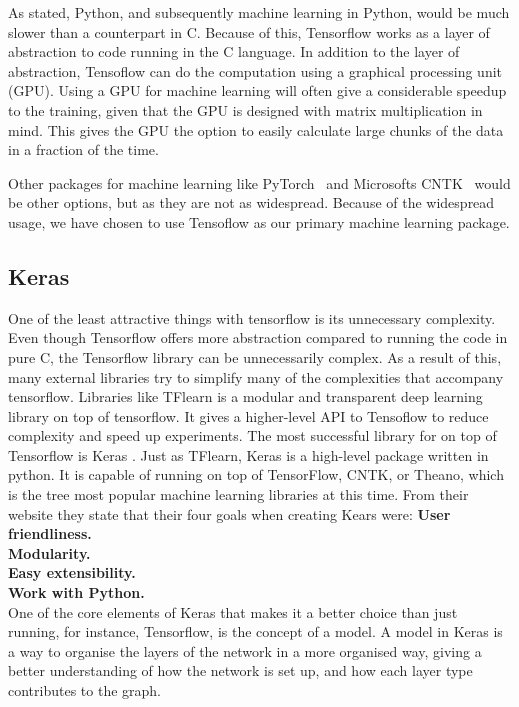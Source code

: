 As stated, Python, and subsequently machine learning in Python, would be much slower than a counterpart in C. Because of this, Tensorflow works as a layer of abstraction to code running in the C language. 
In addition to the layer of abstraction, Tensoflow can do the computation using a graphical processing unit (GPU). Using a GPU for machine learning will often give a considerable speedup to the training, given that the GPU is designed with matrix multiplication in mind. This gives the GPU the option to easily calculate large chunks of the data in a fraction of the time.

Other packages for machine learning like PyTorch~\cite{paszke2017automatic} and Microsofts CNTK~\cite{Seide:2016:CMO:2939672.2945397} would be other options, but as they are not as widespread. Because of the widespread usage, we have chosen to use Tensoflow as our primary machine learning package.



\subsection{Keras}
One of the least attractive things with tensorflow is its unnecessary complexity.  Even though Tensorflow offers more abstraction compared to running the code in pure C, the Tensorflow library can be unnecessarily complex. As a result of this, many external libraries try to simplify many of the complexities that accompany tensorflow. 
Libraries like TFlearn is a modular and transparent deep learning library on top of tensorflow. It gives a higher-level API to Tensoflow to reduce complexity and speed up experiments. 
The most successful library for on top of Tensorflow is Keras . 
Just as TFlearn, Keras is a high-level package written in python. It is capable of running on top of TensorFlow, CNTK, or Theano, which is the tree most popular machine learning libraries at this time. 
From their website they state that their four goals when creating Kears were:
\textbf{User friendliness. }\\
\textbf{Modularity. }\\
\textbf{Easy extensibility.}\\ 
\textbf{Work with Python. }\\

One of the core elements of Keras that makes it a better choice than just running, for instance, Tensorflow, is the concept of a model. A model in Keras is a way to organise the layers of the network in a more organised way, giving a better understanding of how the network is set up, and how each layer type contributes to the graph. 

